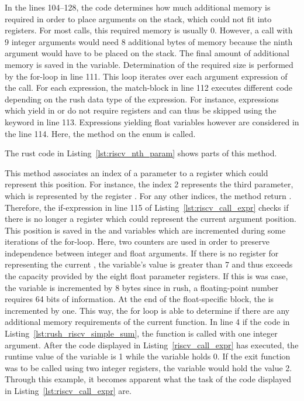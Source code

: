 In the lines 104--128, the code determines how much additional memory is required in order to place arguments on the stack, which could not fit into registers.
For most calls, this required memory is usually 0.
However, a call with 9 integer arguments would need 8 additional bytes of memory because the ninth argument would have to be placed on the stack.
The final amount of additional memory is saved in the  variable.
Determination of the required size is performed by the for-loop in line 111.
This loop iterates over each argument expression of the call.
For each expression, the match-block in line 112 executes different code depending on the rush data type of the expression.
For instance, expressions which yield in \qVerb{()} or \qVerb{!} do not require registers and can thus be skipped using the  keyword in line 113.
Expressions yielding float variables however are considered in the line 114.
Here, the  method on the  enum is called.

The rust code in Listing~\ref{lst:riscv_nth_param} shows parts of this method.


This method associates an index of a parameter to a register which could represent this position.
For instance, the index 2 represents the third parameter, which is represented by the register .
For any other indices, the method return .
Therefore, the if-expression in line 115 of Listing~\ref{lst:riscv_call_expr} checks if there is no longer a register which could represent the current argument position.
This position is saved in the  and  variables which are incremented during some iterations of the for-loop.
Here, two counters are used in order to preserve independence between integer and float arguments.
If there is no register for representing the current , the variable's value is greater than 7 and thus exceeds the capacity provided by the eight float parameter registers.
If this is was case, the  variable is incremented by 8 bytes since in rush, a floating-point number requires 64 bits of information.
At the end of the float-specific block, the  is incremented by one.
This way, the for loop is able to determine if there are any additional memory requirements of the current function.
In line 4 if the code in Listing~\ref{lst:rush_riscv_simple_sum}, the  function is called with one integer argument.
After the code displayed in Listing~\ref{riscv_call_expr} has executed,
the runtime value of the  variable is 1 while the  variable holds 0.
If the exit function was to be called using two integer registers, the  variable would hold the value 2.
Through this example, it becomes apparent what the task of the code displayed in Listing~\ref{lst:riscv_call_expr} are.


